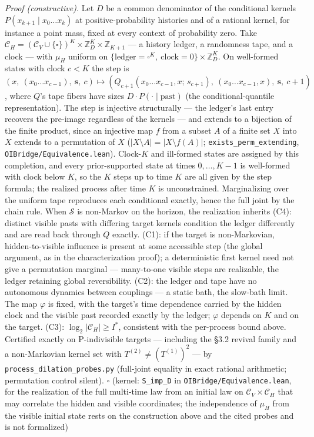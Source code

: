 \documentclass[
]{article}
\begin{document}
\emph{Proof (constructive).} Let \(D\) be a common denominator of the
conditional kernels \(P(x_{k+1} \mid x_0 \ldots x_k)\) at
positive-probability histories and of a rational kernel, for instance a
point mass, fixed at every context of probability zero. Take
\(\mathcal{C}_H = (\mathcal{C}_V \cup \{\square\})^K \times \mathbb{Z}_D^K \times \mathbb{Z}_{K+1}\)
--- a history ledger, a randomness tape, and a clock --- with \(\mu_H\)
uniform on
\(\{\text{ledger} = \square^K,\ \text{clock} = 0\} \times \mathbb{Z}_D^K\).
On well-formed states with clock \(c < K\) the step is
\((x,\ (x_0 \ldots x_{c-1}),\ \mathbf{s},\ c) \mapsto (Q_{c+1}(x_0 \ldots x_{c-1}, x;\, s_{c+1}),\ (x_0 \ldots x_{c-1}, x),\ \mathbf{s},\ c+1)\),
where \(Q\)'s tape fibers have sizes
\(D \cdot P(\cdot \mid \text{past})\) (the conditional-quantile
representation). The step is injective structurally --- the ledger's
last entry recovers the pre-image regardless of the kernels --- and
extends to a bijection of the finite product, since an injective map
\(f\) from a subset \(A\) of a finite set \(X\) into \(X\) extends to a
permutation of \(X\) (\(|X \setminus A| = |X \setminus f(A)|\);
\texttt{exists\_perm\_extending}, \texttt{OIBridge/Equivalence.lean}).
Clock-\(K\) and ill-formed states are assigned by this completion, and
every prior-supported state at times \(0, \ldots, K-1\) is well-formed
with clock below \(K\), so the \(K\) steps up to time \(K\) are all
given by the step formula; the realized process after time \(K\) is
unconstrained. Marginalizing over the uniform tape reproduces each
conditional exactly, hence the full joint by the chain rule. When
\(\mathcal{S}\) is non-Markov on the horizon, the realization inherits
(C4): distinct visible pasts with differing target kernels condition the
ledger differently and are read back through \(Q\) exactly. (C1): if the
target is non-Markovian, hidden-to-visible influence is present at some
accessible step (the global argument, as in the characterization proof);
a deterministic first kernel need not give a permutation marginal ---
many-to-one visible steps are realizable, the ledger retaining global
reversibility. (C2): the ledger and tape have no autonomous dynamics
between couplings --- a static bath, the slow-bath limit. The map
\(\varphi\) is fixed, with the target's time dependence carried by the
hidden clock and the visible past recorded exactly by the ledger;
\(\varphi\) depends on \(K\) and on the target. (C3):
\(\log_2 |\mathcal{C}_H| \geq I^*\), consistent with the per-process
bound above. Certified exactly on P-indivisible targets --- including
the §3.2 revival family and a non-Markovian kernel set with
\(T^{(2)} \neq (T^{(1)})^2\) --- by
\texttt{process\_dilation\_probes.py} (full-joint equality in exact
rational arithmetic; permutation control silent). \(\square\) (kernel:
\texttt{S\_imp\_D} in \texttt{OIBridge/Equivalence.lean}, for the
realization of the full multi-time law from an initial law on
\(\mathcal{C}_V \times \mathcal{C}_H\) that may correlate the hidden and
visible coordinates; the independence of \(\mu_H\) from the visible
initial state rests on the construction above and the cited probes and
is not formalized)
\end{document}
